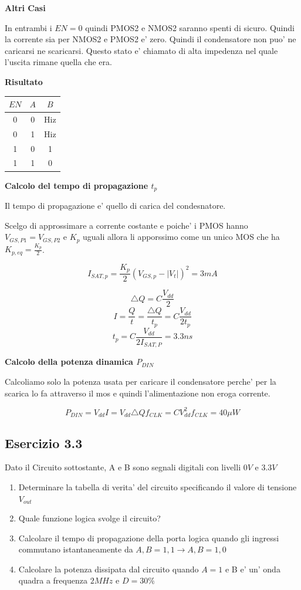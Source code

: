 \documentclass[\main/main.tex]{subfiles}
\begin{document}
\textbf{Altri Casi}

In entrambi i $EN = 0$ quindi PMOS2 e NMOS2 saranno spenti di sicuro.
Quindi la corrente sia per NMOS2 e PMOS2 e' zero.
Quindi il condensatore non puo' ne caricarsi ne scaricarsi.
Questo stato e' chiamato di alta impedenza nel quale l'uscita rimane quella che era.

\textbf{Risultato}
\begin{center}
	\begin{tabular}{ c  c | c}
		$EN$ & $A$ & $B$ \\
		\hline
		0    & 0   & Hiz \\
		0    & 1   & Hiz \\
		1    & 0   & 1   \\
		1    & 1   & 0   \\
	\end{tabular}
\end{center}

\textbf{Calcolo del tempo di propagazione $t_p$}

Il tempo di propagazione e' quello di carica del condesnatore.

Scelgo di approssimare a corrente costante e poiche' i PMOS hanno $V_{GS,P1} = V_{GS,P2}$ e $K_p$ uguali allora li apporssimo come un unico MOS che ha $K_{p,eq} =  \frac{K_p}{2}$.

\[I_{SAT,p} = \frac{K_p}{2} \left( V_{GS,p} - |V_t| \right)^2 = 3mA\]

\[ \triangle Q = C \frac{V_{dd}}{2} \]
\[ I = \frac{Q}{t} = \frac{\triangle Q}{t_p} = C \frac{V_{dd}}{2 t_p} \]
\[ t_p = C \frac{V_{dd}}{2 I_{SAT,P}} = 3.3ns\]

\textbf{Calcolo della potenza dinamica $P_{DIN}$}

Calcoliamo solo la potenza usata per caricare il condensatore perche' per la scarica lo fa attraverso il mos e quindi l'alimentazione non eroga corrente.

\[P_{DIN} = V_{dd} I = V_{dd} \triangle Q f_{CLK} = C V_{dd}^2 f_{CLK} = 40 \mu W\]

\clearpage
\subsection{Esercizio 3.3}
Dato il Circuito sottostante, A e B sono segnali digitali con livelli $0V$ e $3.3V$

\begin{enumerate}
	\item Determinare la tabella di verita' del circuito specificando il valore di tensione $V_{out}$
	\item Quale funzione logica svolge il circuito?
	\item Calcolare il tempo di propagazione della porta logica quando gli ingressi commutano istantaneamente da  $A,B = 1,1 \longrightarrow A,B = 1,0$
	\item Calcolare la potenza dissipata dal circuito quando $A=1$ e B e' un' onda quadra a frequenza $2MHz$ e $D=30\%$
\end{enumerate}
\end{document}
